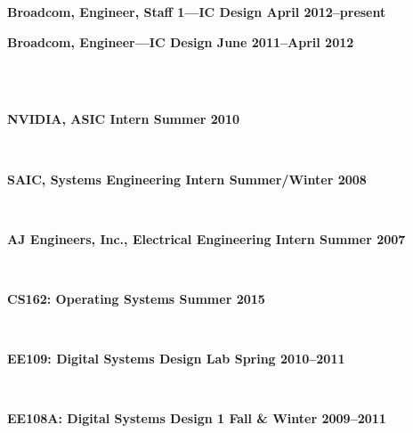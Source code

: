 \documentclass[10pt]{article} %
\begin{document}
\begin {minipage}[t]{0.2\linewidth}
\vspace{0pt}
\end {minipage}
\begin {minipage}[t]{0.8\linewidth}
\vspace{0pt}
\centerline {{\bf Broadcom, Engineer, Staff 1---IC Design \hfill April 2012--present}}
\centerline {{\bf Broadcom, Engineer---IC Design \hfill June 2011--April 2012}}
 \\

 \\
\centerline {\bf NVIDIA, ASIC Intern \hfill Summer 2010}
 \\

\centerline {\bf SAIC, Systems Engineering Intern \hfill Summer/Winter 2008}
 \\

\centerline {\bf AJ Engineers, Inc., Electrical Engineering Intern \hfill Summer 2007}
 \\

\end {minipage}

\begin {minipage}[t]{0.2\linewidth}
\vspace{0pt}
\end {minipage}
\begin {minipage}[t]{0.8\linewidth}
\vspace{0pt}
\centerline {{\bf CS162: Operating Systems \hfill Summer 2015}}
 \\

\end {minipage}

\begin {minipage}[t]{0.2\linewidth}
\vspace{0pt}
\end {minipage}
\begin {minipage}[t]{0.8\linewidth}
\vspace{0pt}
\centerline {{\bf EE109: Digital Systems Design Lab \hfill Spring 2010--2011}}
 \\

\centerline {{\bf EE108A: Digital Systems Design 1 \hfill Fall \& Winter 2009--2011}}
 \\
\end {minipage}
\end{document}
